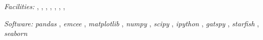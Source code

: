 \documentclass[twocolumn]{emulateapj}%
\newcommand{\project}[1]{\textsl{#1}}
\begin{document}
{\it Facilities:} , , , , , , , 

{\it Software: } 
 \project{pandas} \citep{mckinney10},
 \project{emcee} \citep{foreman13},
 \project{matplotlib} \citep{hunter07},
 \project{numpy} \citep{vanderwalt11},
 \project{scipy} \citep{jones01},
 \project{ipython} \citep{perez07},
 \project{gatspy} \citep{JakeVanderplas2015},
 \project{starfish} \citep{czekala15},
 \project{seaborn} \citep{waskom14}

\clearpage



\end{document}
